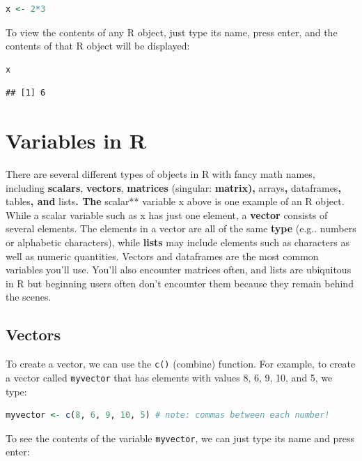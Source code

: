 \documentclass[
]{book}
\newcommand{\passthrough}[1]{#1}
\begin{document}
\begin{lstlisting}[language=R]
x <- 2*3
\end{lstlisting}

To view the contents of any R object, just type its name, press enter, and the contents of that R object will be displayed:

\begin{lstlisting}[language=R]
x
\end{lstlisting}

\begin{lstlisting}
## [1] 6
\end{lstlisting}

\hypertarget{variables-in-r}{%
\section{Variables in R}\label{variables-in-r}}

There are several different types of objects in R with fancy math names, including \textbf{scalars}, \textbf{vectors}, \textbf{matrices} (singular: \textbf{matrix), }arrays\textbf{, }dataframes\textbf{, }tables\textbf{, and }lists\textbf{. The }scalar** variable x above is one example of an R object. While a scalar variable such as x has just one element, a \textbf{vector} consists of several elements. The elements in a vector are all of the same \textbf{type} (e.g.. numbers or alphabetic characters), while \textbf{lists} may include elements such as characters as well as numeric quantities. Vectors and dataframes are the most common variables you'll use. You'll also encounter matrices often, and lists are ubiquitous in R but beginning users often don't encounter them because they remain behind the scenes.

\hypertarget{vectors}{%
\subsection{Vectors}\label{vectors}}

To create a vector, we can use the \passthrough{\lstinline!c()!} (combine) function. For example, to create a vector called \passthrough{\lstinline!myvector!} that has elements with values 8, 6, 9, 10, and 5, we type:

\begin{lstlisting}[language=R]
myvector <- c(8, 6, 9, 10, 5) # note: commas between each number!
\end{lstlisting}

To see the contents of the variable \passthrough{\lstinline!myvector!}, we can just type its name and press enter:
\end{document}

